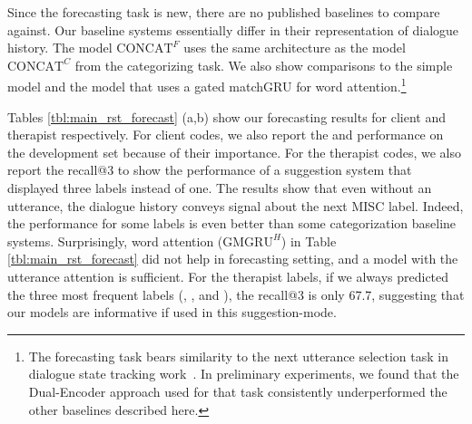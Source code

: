  Since the forecasting task is
new, there are no published baselines to compare against. Our
baseline systems essentially differ in their representation of
dialogue history. The model $\text{CONCAT}^{F}$ uses the same
architecture as the model $\text{CONCAT}^{C}$ from the categorizing
task. We also show comparisons to the simple \HGRU model and the
\GMGRUH model that uses a gated matchGRU for word
attention.\footnote{The forecasting task bears similarity to the
  next utterance selection task in dialogue state tracking
  work~\cite{DSTC7}. In preliminary experiments, we found that the
  Dual-Encoder approach used for that task consistently
  underperformed the other baselines described here.}

Tables \ref{tbl:main_rst_forecast} (a,b) show our forecasting results for
client and therapist respectively. For client codes, we also report
the \CHANGE and \SUSTAIN performance on the development set because
of their importance.  For the therapist codes, we also report the
recall@3 to show the performance of a suggestion system that
displayed three labels instead of one.
%
The results show that even without an utterance, the dialogue
history conveys signal about the next MISC label. Indeed, the
performance for some labels is even better than some categorization
baseline systems. Surprisingly, word attention ($\text{GMGRU}^{H}$)
in Table \ref{tbl:main_rst_forecast} did not help in forecasting
setting, and a model with the \self utterance attention is
sufficient. For the therapist labels, if we always predicted the
three most frequent labels (\FA, \GI, and \RES), the recall@3 is
only 67.7, suggesting that our models are informative if used in
this suggestion-mode.

